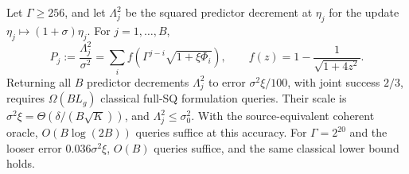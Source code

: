 \begin{theorem}\label{thm:socp-trajectory}
Let $\Gamma\geq256$, and let $\Lambda_j^2$ be the squared predictor
decrement at $\eta_j$ for the update $\eta_j\mapsto(1+\sigma)\eta_j$.
For $j=1,\ldots,B$,
\begin{equation}\label{eq:decrement-trajectory}
 P_j:=\frac{\Lambda_j^2}{\sigma^2}
 =\sum_i f\!\left(\Gamma^{j-i}\sqrt{1+\xi\Phi_i}\right),
 \qquad f(z)=1-\frac1{\sqrt{1+4z^2}}.
\end{equation}
Returning all $B$ predictor decrements $\Lambda_j^2$ to error
$\sigma^2\xi/100$, with joint
success $2/3$, requires $\Omega(BL_g)$ classical full-SQ formulation
queries.  Their scale is
$\sigma^2\xi=\Theta(\delta/(B\sqrt K))$, and $\Lambda_j^2\leq\sigma_0^2$.
With the source-equivalent coherent oracle, $O(B\log(2B))$ queries
suffice at this accuracy.  For $\Gamma=2^{20}$ and the looser error
$0.036\sigma^2\xi$, $O(B)$ queries suffice, and the same classical lower
bound holds.
\end{theorem}
